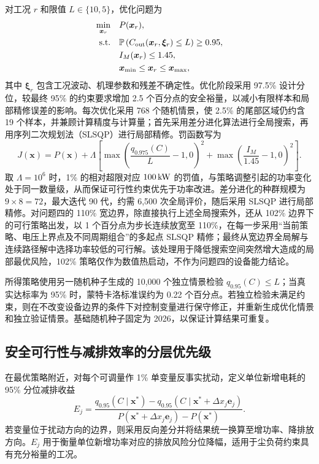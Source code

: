 对工况 $r$ 和限值 $L\in\{10,5\}$，优化问题为
\begin{align}
\min_{\bm x_r}\quad & P(\bm x_r),\label{eq:obj}\\
\text{s.t.}\quad & \mathbb{P}\left(C_{\mathrm{out}}(\bm x_r,\bm\xi_r)\le L\right)\ge0.95,\label{eq:chance}\\
& I_M(\bm x_r)\le1.45,\label{eq:dustconstraint}\\
& \bm x_{\min}\le\bm x_r\le\bm x_{\max},\label{eq:bounds}
\end{align}
其中 $\bm\xi_r$ 包含工况波动、机理参数和残差不确定性。优化阶段采用 97.5\% 设计分位，较最终 95\% 的约束要求增加 2.5 个百分点的安全裕量，以减小有限样本和局部精修误差的影响。每次优化采用 768 个随机情景，使 2.5\% 的尾部区域仍约含 19 个样本，并兼顾计算精度与计算量；首先采用差分进化算法进行全局搜索，再用序列二次规划法（SLSQP）进行局部精修。罚函数写为
\begin{equation}
J(\bm x)=P(\bm x)+\Lambda\left[
\max\left(\frac{q_{0.975}(C)}{L}-1,0\right)^2
+\max\left(\frac{I_M}{1.45}-1,0\right)^2\right].
\label{eq:penalty}
\end{equation}
取 $\Lambda=10^6$ 时，1\% 的相对超限对应 $100\,\mathrm{kW}$ 的罚值，与策略调整引起的功率变化处于同一数量级，从而保证可行性约束优先于功率改进。差分进化的种群规模为 $9\times8=72$，最大迭代 90 代，约需 6,500 次全局评价，随后采用 SLSQP 进行局部精修。对问题四的 110\% 宽边界，除直接执行上述全局搜索外，还从 102\% 边界下的可行策略出发，以 1 个百分点为步长连续放宽至 110\%，在每一步采用“当前策略、电压上界点及不同周期组合”的多起点 SLSQP 精修；最终从宽边界全局解与连续路径解中选择功率较低的可行解。该处理用于降低搜索空间突然增大造成的局部最优风险，102\% 策略仅作为数值热启动，不作为问题四的设备能力结论。

所得策略使用另一随机种子生成的 10,000 个独立情景检验 $q_{0.95}(C)\le L$；当真实达标率为 95\% 时，蒙特卡洛标准误约为 0.22 个百分点。若独立检验未满足约束，则在不改变设备边界的条件下对控制变量进行保守修正，并重新生成优化情景和独立验证情景。基础随机种子固定为 2026，以保证计算结果可重复。

\subsection{安全可行性与减排效率的分层优先级}

在最优策略附近，对每个可调量作 1\% 单变量反事实扰动，定义单位新增电耗的 95\% 分位减排收益
\begin{equation}
E_j=\frac{q_{0.95}(C\mid\bm x^*)-q_{0.95}(C\mid\bm x^*+\Delta x_j\bm e_j)}
{P(\bm x^*+\Delta x_j\bm e_j)-P(\bm x^*)}.
\label{eq:priority}
\end{equation}
若变量位于扰动方向的边界，则采用反向差分并将结果统一换算至增功率、降排放方向。$E_j$ 用于衡量单位新增功率对应的排放风险分位降幅，适用于尘负荷约束具有充分裕量的工况。

